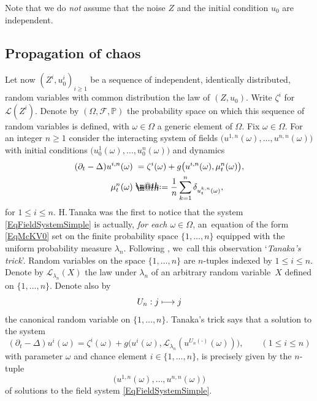 \documentclass[10pt]{amsart}
\makeatletter
\newcommand\mto{\mathchoice{\longmapsto}{\mapsto}{\mapsto}{\mapsto}}
\theoremstyle{definition}
\newcommand{\mcF}{\mathcal{F}}
\newcommand{\mcL}{\mathcal{L}}
\newcommand*{\defeq}{\mathrel{\rlap{%
\raisebox{0.3ex}{$\m@th\cdot$}}%
\raisebox{-0.3ex}{$\m@th\cdot$}}%
=}
\makeatother
\begin{document}
Note that we do {\it not} assume that the noise $Z$ and the initial condition $u_0$ are independent.

\subsection{Propagation of chaos}
\label{SubsectionAdditiveChaos}

Let now $(Z^i,u_0^i)_{i\geq 1}$ be a sequence of independent, identically distributed, random variables with common distribution the law of $(Z,u_0)$. Write $\zeta^i$ for $\mathscr{L}(Z^i)$. Denote by $(\Omega,\mcF,\mathbb{P})$ the probability space on which this sequence of random variables is defined, with $\omega\in\Omega$ a generic element of $\Omega$. Fix $\omega\in\Omega$. For an integer $n\geq 1$ consider the interacting system of fields $\bigl(u^{1,n}(\omega),\dots,u^{n,n}(\omega)\bigr)$ with initial conditions $\bigl(u^1_0(\omega),\dots,u^n_0(\omega)\bigr)$ and dynamics
\begin{equation} \label{EqFieldSystemSimple} \begin{split}
(\partial_t-\Delta)u^{i,n}(\omega) &\;= \zeta^i(\omega) + g\bigl(u^{i,n}(\omega),\mu_t^n(\omega)\bigr), \\
\mu_t^n(\omega) &\defeq \frac{1}{n}\sum_{k=1}^n \delta_{u_t^{k,n}(\omega)},
\end{split} \end{equation}
for $1\leq i\leq n$. H.\,Tanaka \cite{Tanaka} was the first to notice that the system \eqref{EqFieldSystemSimple} is actually, {\it for each $\omega\in\Omega$}, an~equation of the form \eqref{EqMcKV0} set on the finite probability space $\{1,\dots,n\}$ equipped with the uniform probability measure $\lambda_n$. Following \cite{roughchaos}, we~call this observation `\emph{Tanaka's trick}'. Random variables on the space $\{1,\dots,n\}$ are $n$\nobreakdash-tuples indexed by $1\leq i\leq n$. Denote by $\mcL_{\lambda_n}(X)$ the law under $\lambda_n$ of an arbitrary random variable~$X$ defined on $\{1,\dots,n\}$. Denote also by
\[
U_n : j\mto j
\]
the canonical random variable on $\{1,\dots,n\}$. Tanaka's trick says that a solution to the system
\[
(\partial_t-\Delta)u^i(\omega) = \zeta^i(\omega) + g\bigl(u^i(\omega), \mcL_{\lambda_n}(u^{U_n(\cdot)}(\omega))\bigr), \qquad (1\leq i\leq n)
\]
with parameter $\omega$ and chance element $i\in\{1,\dots,n\}$, is precisely given by the $n$-tuple
\[
\bigl(u^{1,n}(\omega),\dots,u^{n,n}(\omega)\bigr)
\]
of solutions to the field system \eqref{EqFieldSystemSimple}.
\end{document}
